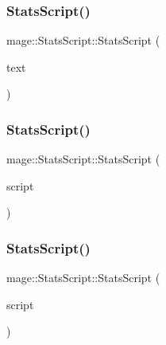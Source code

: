 \subsubsection{\texorpdfstring{Stats\+Script()}{StatsScript()}\hspace{0.1cm}{\footnotesize\ttfamily [1/3]}}
{\footnotesize\ttfamily mage\+::\+Stats\+Script\+::\+Stats\+Script (\begin{DoxyParamCaption}\item[{\hyperlink{namespacemage_a1e01ae66713838a7a67d30e44c67703e}{Shared\+Ptr}$<$ \hyperlink{classmage_1_1_sprite_text}{Sprite\+Text} $>$}]{text }\end{DoxyParamCaption})\hspace{0.3cm}{\ttfamily [explicit]}}

\hypertarget{classmage_1_1_stats_script_aab237b7c391d7ca7ad96cfa33a3aac81}{}\label{classmage_1_1_stats_script_aab237b7c391d7ca7ad96cfa33a3aac81} 
\subsubsection{\texorpdfstring{Stats\+Script()}{StatsScript()}\hspace{0.1cm}{\footnotesize\ttfamily [2/3]}}
{\footnotesize\ttfamily mage\+::\+Stats\+Script\+::\+Stats\+Script (\begin{DoxyParamCaption}\item[{const \hyperlink{classmage_1_1_stats_script}{Stats\+Script} \&}]{script }\end{DoxyParamCaption})\hspace{0.3cm}{\ttfamily [delete]}}

\hypertarget{classmage_1_1_stats_script_a1917ed129f6c741f640f0648a378cb3e}{}\label{classmage_1_1_stats_script_a1917ed129f6c741f640f0648a378cb3e} 
\subsubsection{\texorpdfstring{Stats\+Script()}{StatsScript()}\hspace{0.1cm}{\footnotesize\ttfamily [3/3]}}
{\footnotesize\ttfamily mage\+::\+Stats\+Script\+::\+Stats\+Script (\begin{DoxyParamCaption}\item[{\hyperlink{classmage_1_1_stats_script}{Stats\+Script} \&\&}]{script }\end{DoxyParamCaption})\hspace{0.3cm}{\ttfamily [default]}}


